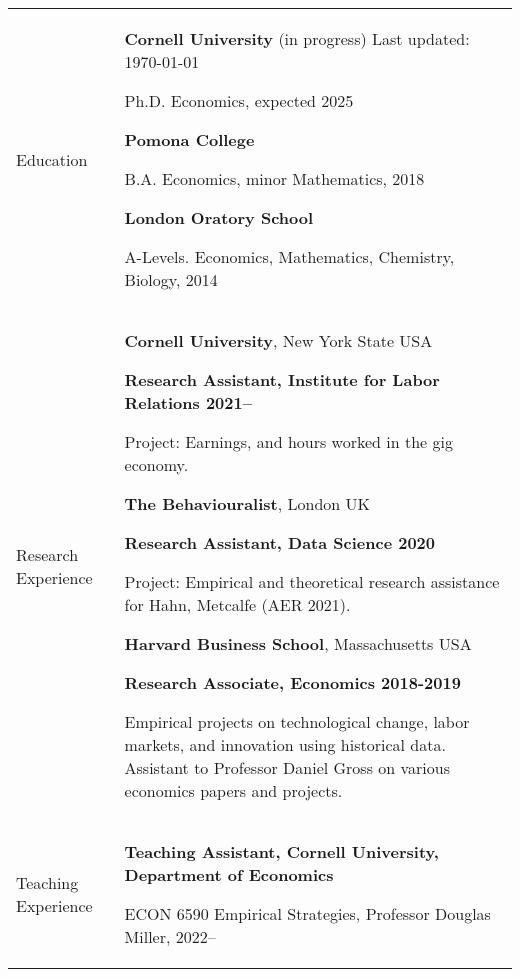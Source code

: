 \documentclass[letterpaper,11pt,oneside]{article}
\begin{document}
\noindent
\begin{tabular}[\textwidth]{p{} p{}}
    \Large{Education}
    & \textbf{Cornell University} (in progress)  \hfill Last updated: \today

    Ph.D. Economics, expected 2025 \vspace{0.1cm}
    
    \textbf{Pomona College}

    B.A. Economics, minor Mathematics, 2018 \vspace{0.1cm}
    
    \textbf{London Oratory School}
    
    A-Levels. Economics, Mathematics, Chemistry, Biology, 2014 \vspace{0.2cm} \\
    
\Large{Research Experience}
    & \textbf{Cornell University}, New York State USA 
    
    \textbf{Research Assistant, Institute for Labor Relations 2021--}

    Project: Earnings, and hours worked in the gig economy.
    \vspace{0.2cm}
    
    \textbf{The Behaviouralist}, London UK
    
    \textbf{Research Assistant, Data Science 2020}
    
    Project: Empirical and theoretical research assistance for Hahn, Metcalfe (AER 2021).
    \vspace{0.2cm}

    \textbf{Harvard Business School}, Massachusetts USA
    
    \textbf{Research Associate, Economics 2018-2019}
    
    Empirical projects on technological change, labor markets, and innovation using historical data.
    Assistant to Professor Daniel Gross on various economics papers and projects.
    \vspace{0.2cm} \\

\Large{Teaching Experience}
    & \textbf{Teaching Assistant, Cornell University, Department of Economics}
    
    ECON 6590 Empirical Strategies, Professor Douglas Miller, 2022-- \\


\end{tabular}
\end{document}
